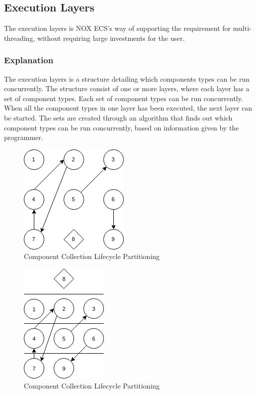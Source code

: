\subsection{Execution Layers}
\label{subsec:detailed_execution_layers}
The execution layers is NOX ECS's way of supporting the requirement for multi-threading,
without requiring large investments for the user.

\subsubsection{Explanation}
The execution layers is a structure detailing which components types can be run concurrently.
The structure consist of one or more layers, where each layer has a set of component types.
Each set of component types can be run concurrently.
When all the component types in one layer has been executed, the next layer can be started.
The sets are created through an algorithm that finds out which component types can be run concurrently,
based on information given by the programmer.

\begin{figure}[tbp]
    \begin{center}
    \includegraphics[scale=0.45]{images/layered_execution_model_1.png}
    \caption[Execution layers, not layered]{Component Collection Lifecycle Partitioning}
    \label{fig:execution_layers_model_1}
    \end{center}
\end{figure}

\begin{figure}[tbp]
    \begin{center}
    \includegraphics[scale=0.45]{images/layered_execution_model_2.png}
    \caption{Component Collection Lifecycle Partitioning}
    \label{fig:execution_layers_model_2}
    \end{center}
\end{figure}

